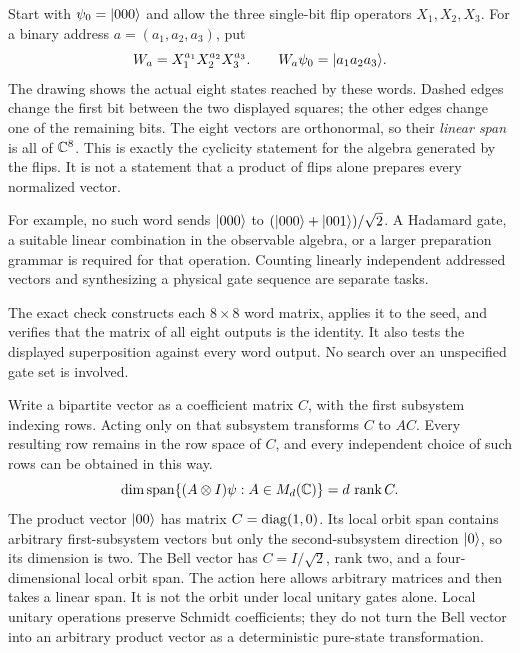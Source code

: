 Start with $\psi_0=\lvert 000\rangle$ and allow the three single-bit flip operators $X_1,X_2,X_3$. For a binary address $a=(a_1,a_2,a_3)$, put
\[
W_a=X_1^{a_1}X_2^{a_2}X_3^{a_3}.
\qquad W_a\psi_0=\lvert a_1a_2a_3\rangle.
\]
The drawing shows the actual eight states reached by these words. Dashed edges change the first bit between the two displayed squares; the other edges change one of the remaining bits.
The eight vectors are orthonormal, so their \emph{linear span} is all of $\mathbb C^8$. This is exactly the cyclicity statement for the algebra generated by the flips. It is not a statement that a product of flips alone prepares every normalized vector.

For example, no such word sends $\lvert 000\rangle$ to $(\lvert 000\rangle+\lvert 001\rangle)/\sqrt2$. A Hadamard gate, a suitable linear combination in the observable algebra, or a larger preparation grammar is required for that operation. Counting linearly independent addressed vectors and synthesizing a physical gate sequence are separate tasks.

The exact check constructs each $8\times8$ word matrix, applies it to the seed, and verifies that the matrix of all eight outputs is the identity. It also tests the displayed superposition against every word output. No search over an unspecified gate set is involved.

Write a bipartite vector as a coefficient matrix $C$, with the first subsystem indexing rows. Acting only on that subsystem transforms $C$ to $AC$. Every resulting row remains in the row space of $C$, and every independent choice of such rows can be obtained in this way.
\[
\dim\operatorname{span}\{(A\otimes I)\psi:A\in M_d(\mathbb C)\}
=d\,\operatorname{rank} C.
\]
The product vector $\lvert 00\rangle$ has matrix $C=\operatorname{diag}(1,0)$. Its local orbit span contains arbitrary first-subsystem vectors but only the second-subsystem direction $\lvert 0\rangle$, so its dimension is two. The Bell vector has $C=I/\sqrt2$, rank two, and a four-dimensional local orbit span.
The action here allows arbitrary matrices and then takes a linear span. It is not the orbit under local unitary gates alone. Local unitary operations preserve Schmidt coefficients; they do not turn the Bell vector into an arbitrary product vector as a deterministic pure-state transformation.

